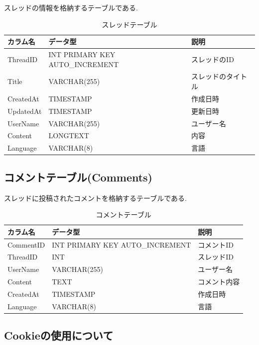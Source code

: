 \documentclass[b5paper,12pt,dvipdfmx]{jsreport}
\begin{document}
スレッドの情報を格納するテーブルである.

\begin{table}[H]
    \centering
    \caption{スレッドテーブル}
    \begin{tabular}{|l|l|l|}
        \hline
        \textbf{カラム名} & \textbf{データ型} & \textbf{説明} \\
        \hline
        ThreadID   & INT PRIMARY KEY AUTO\_INCREMENT & スレッドのID \\
        Title      & VARCHAR(255) & スレッドのタイトル \\
        CreatedAt  & TIMESTAMP & 作成日時 \\
        UpdatedAt  & TIMESTAMP & 更新日時 \\
        UserName   & VARCHAR(255) & ユーザー名 \\
        Content    & LONGTEXT & 内容 \\
        Language   & VARCHAR(8) & 言語 \\
        \hline
    \end{tabular}
\end{table}

\subsection*{コメントテーブル(Comments)}

スレッドに投稿されたコメントを格納するテーブルである.

\begin{table}[H]
    \centering
    \caption{コメントテーブル}
    \begin{tabular}{|l|l|l|}
        \hline
        \textbf{カラム名} & \textbf{データ型} & \textbf{説明} \\
        \hline
        CommentID  & INT PRIMARY KEY AUTO\_INCREMENT & コメントID \\
        ThreadID   & INT & スレッドID \\
        UserName   & VARCHAR(255) & ユーザー名 \\
        Content    & TEXT & コメント内容 \\
        CreatedAt  & TIMESTAMP & 作成日時 \\
        Language   & VARCHAR(8) & 言語 \\
        \hline
    \end{tabular}
\end{table}

\subsection*{Cookieの使用について}
\end{document}
